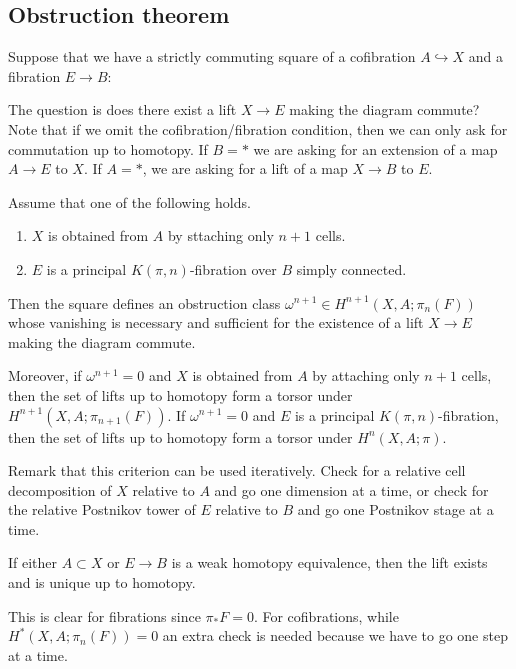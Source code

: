 \documentclass[12pt]{article}
\begin{document}
\subsection{Obstruction theorem}
Suppose that we have a strictly commuting square of a cofibration $A \hookrightarrow X$ and a fibration $E \to B$:
\begin{center}
\end{center}
The question is does there exist a lift $X \to E$ making the diagram commute? Note that if we omit the cofibration/fibration condition, then we can only ask for commutation up to homotopy. If $B = *$ we are asking for an extension of a map $A \to E$ to $X$. If $A = *$, we are asking for a lift of a map $X \to B$ to $E$.  

\begin{theorem}
    Assume that one of the following holds.
    \begin{enumerate}
        \item $X$ is obtained from $A$ by sttaching only $n+1$ cells.
        \item $E$ is a principal $K(\pi,n)$-fibration over $B$ simply connected.
    \end{enumerate} Then the square defines an obstruction class $\omega^{n+1} \in H^{n+1}(X,A;\pi_n(F))$ whose vanishing is necessary and sufficient for the existence of a lift $X \to E$ making the diagram commute. 
    
    Moreover, if $\omega^{n+1} = 0$ and $X$ is obtained from $A$ by attaching only $n+1$ cells, then the set of lifts up to homotopy form a torsor under $H^{n+1}(X,A;\pi_{n+1}(F))$. If $\omega^{n+1} = 0$ and $E$ is a principal $K(\pi,n)$-fibration, then the set of lifts up to homotopy form a torsor under $H^n(X,A;\pi)$.
\end{theorem}



Remark that this criterion can be used iteratively. Check for a relative cell decomposition of $X$ relative to $A$ and go one dimension at a time, or check for the relative Postnikov tower of $E$ relative to $B$ and go one Postnikov stage at a time.

\begin{corollary}
    If either $A \subset X$ or $E\to B$ is a weak homotopy equivalence, then the lift exists and is unique up to homotopy.
\end{corollary}
This is clear for fibrations since $\pi_* F = 0$. For cofibrations, while $H^*(X,A;\pi_n(F)) = 0$ an extra check is needed because we have to go one step at a time.
\end{document}
